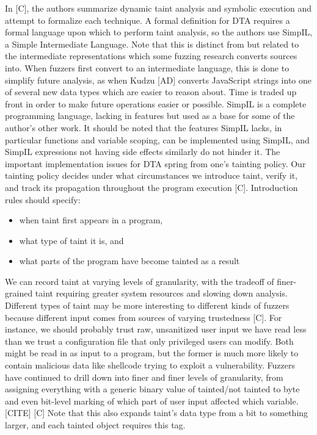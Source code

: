 \documentclass[11pt,expanded,copyright]{fsuthesis}
\begin{document}
In [C], the authors summarize dynamic taint analysis and symbolic execution and attempt to formalize each technique. A formal definition for DTA requires a formal language upon which to perform taint analysis, so the authors use SimpIL, a Simple Intermediate Language. Note that this is distinct from but related to the intermediate representations which some fuzzing research converts sources into. When fuzzers first convert to an intermediate language, this is done to simplify future analysis, as when Kudzu [AD] converts JavaScript strings into one of several new data types which are easier to reason about. Time is traded up front in order to make future operations easier or possible. SimpIL is a complete programming language, lacking in features but used as a base for some of the author's other work. It should be noted that the features SimpIL lacks, in particular functions and variable scoping, can be implemented using SimpIL, and SimpIL expressions not having side effects similarly do not hinder it. The important implementation issues for DTA spring from one's tainting policy. Our tainting policy decides under what circumstances we introduce taint, verify it, and track its propagation throughout the program execution [C]. Introduction rules should specify:
\begin{itemize}
	\item when taint first appears in a program,
	\item what type of taint it is, and 
	\item what parts of the program have become tainted as a result
\end{itemize}

We can record taint at varying levels of granularity, with the tradeoff of finer-grained taint requiring greater system resources and slowing down analysis. Different types of taint may be more interesting to different kinds of fuzzers because different input comes from sources of varying trustedness [C]. For instance, we should probably trust raw, unsanitized user input we have read less than we trust a configuration file that only privileged users can modify. Both might be read in as input to a program, but the former is much more likely to contain malicious data like shellcode trying to exploit a vulnerability. Fuzzers have continued to drill down into finer and finer levels of granularity, from assigning everything with a generic binary value of tainted/not tainted to byte and even bit-level marking of which part of user input affected which variable. [CITE] [C] Note that this also expands taint's data type from a bit to something larger, and each tainted object requires this tag.
\end{document}

